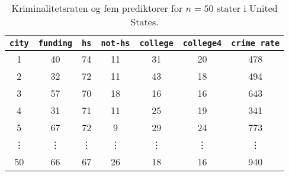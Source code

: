 \begin{table}[ht] 
\centering 
\begin{tabular}{c|cccccc} 
\texttt{city} & \texttt{funding} & \texttt{hs} & \texttt{not-hs} & \texttt{college} & \texttt{college4} & \texttt{crime rate} \\
\midrule
1 & 40 & 74 & 11 & 31 & 20 & 478 \\
2 & 32 & 72 & 11 & 43 & 18 & 494 \\
3 & 57 & 70 & 18 & 16 & 16 & 643 \\
4 & 31 & 71 & 11 & 25 & 19 & 341 \\
5 & 67 & 72 & 9 & 29 & 24 & 773 \\
\vdots & \vdots & \vdots & \vdots & \vdots & \vdots & \vdots \\
50 & 66 & 67 & 26 & 18 & 16 & 940 \\
\bottomrule
\end{tabular}  
\caption{Kriminalitetsraten og fem prediktorer for \(n=50\) stater i United States.} \label{tab:crime} 
\end{table} 